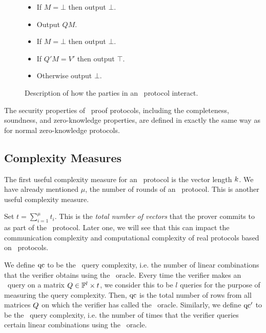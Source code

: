 \begin{figure}[!h]
{\begin{minipage}[t]{6.5cm}
\begin{algorithm}[H]
\caption*{\ILCopen($Q$)}
\begin{itemize}
\item If $M = \bot$ then output $\bot$.
\item Output $QM$.
\end{itemize}
\end{algorithm}
\begin{algorithm}[H]
\caption*{\ILCcheck($Q', V'$)}
\begin{itemize}
\item If $M = \bot$ then output $\bot$.
\item If $Q'M = V'$ then output $\top$.
\item Otherwise output $\bot$.
\end{itemize}
\end{algorithm}
\end{minipage}
}
\caption{Description of how the parties in an \ILC\ protocol interact.}
\label{fig:ILCpseudocode}
\end{figure}

The security properties of \ILC\ proof protocols, including the completeness, soundness, and zero-knowledge properties, are defined in exactly the same way as for normal zero-knowledge protocols.

\subsection{Complexity Measures}

The first useful complexity measure for an \ILC\ protocol is the vector length $k$. We have already mentioned $\mu$, the number of rounds of an \ILC\ protocol. This is another useful complexity measure.

Set $t = \sum_{i=1}^\mu t_i$. This is the \emph{total number of vectors} that the prover commits to as part of the \ILC\ protocol. Later one, we will see that this can impact the communication complexity and computational complexity of real protocols based on \ILC\ protocols.

We define $\mathrm{qc}$ to be the \ILCopen\ query complexity, i.e. the number of linear combinations that the verifier obtains using the \ILCopen\ oracle. Every time the verifier makes an \ILCopen\ query on a matrix $Q \in \mathbb{F}^l \times t$, we consider this to be $l$ queries for the purpose of measuring the query complexity. Then, $\mathrm{qc}$ is the total number of rows from all matrices $Q$ on which the verifier has called the \ILCopen\ oracle. Similarly, we define $\mathrm{qc}'$ to be the \ILCcheck\ query complexity, i.e. the number of times that the verifier queries certain linear combinations using the \ILCcheck\ oracle. 

